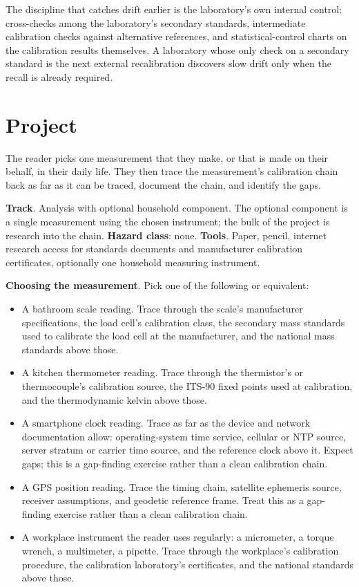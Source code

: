 The discipline that catches drift earlier is the laboratory's own
internal control: cross-checks among the laboratory's secondary
standards, intermediate calibration checks against alternative
references, and statistical-control charts on the calibration
results themselves. A laboratory whose only check on a secondary
standard is the next external recalibration discovers slow drift
only when the recall is already required.

\section{Project}

\begin{project}
The reader picks one measurement that they make, or that is made on
their behalf, in their daily life. They then trace the measurement's
calibration chain back as far as it can be traced, document the
chain, and identify the gaps.

\textbf{Track}. Analysis with optional household component. The
optional component is a single measurement using the chosen
instrument; the bulk of the project is research into the chain.
\textbf{Hazard class}: none.
\textbf{Tools}. Paper, pencil, internet research access for
standards documents and manufacturer calibration certificates,
optionally one household measuring instrument.

\textbf{Choosing the measurement}. Pick one of the following or
equivalent:

\begin{itemize}[leftmargin=*]
  \item A bathroom scale reading. Trace through the scale's
    manufacturer specifications, the load cell's calibration class,
    the secondary mass standards used to calibrate the load cell at
    the manufacturer, and the national mass standards above those.
  \item A kitchen thermometer reading. Trace through the
    thermistor's or thermocouple's calibration source, the ITS-90
    fixed points used at calibration, and the thermodynamic kelvin
    above those.
  \item A smartphone clock reading. Trace as far as the device and
    network documentation allow: operating-system time service,
    cellular or NTP source, server stratum or carrier time source,
    and the reference clock above it. Expect gaps; this is a
    gap-finding exercise rather than a clean calibration chain.
  \item A GPS position reading. Trace the timing chain, satellite
    ephemeris source, receiver assumptions, and geodetic reference
    frame. Treat this as a gap-finding exercise rather than a clean
    calibration chain.
  \item A workplace instrument the reader uses regularly: a
    micrometer, a torque wrench, a multimeter, a pipette. Trace
    through the workplace's calibration procedure, the calibration
    laboratory's certificates, and the national standards above
    those.
\end{itemize}


\end{project}
